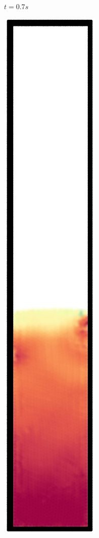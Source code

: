 \begin{figure}[h]
\begin{subfigure}[t]{0.09\textwidth}
    \caption{\small{$t=0.7s$}}
  \end{subfigure}%
  \begin{subfigure}[t]{0.09\textwidth}
    \includegraphics[width=\textwidth]{images/oscillate/080.jpg}

\end{subfigure}
\end{figure}
